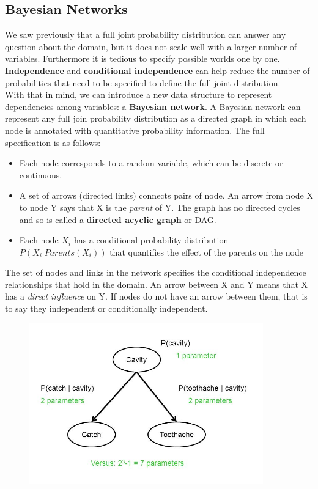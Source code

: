 \documentclass{article}
\newcommand{\n}[0]{\\[\baselineskip]}
\begin{document}
\subsection{Bayesian Networks}
We saw previously that a full joint probability distribution can answer any question about the domain, but it does not scale well with a larger number of variables. Furthermore it is tedious to specify possible worlds one by one. \textbf{Independence} and \textbf{conditional independence} can help reduce the number of probabilities that need to be specified to define the full joint distribution.
\n
With that in mind, we can introduce a new data structure to represent dependencies among variables: a \textbf{Bayesian network}. A Bayesian network can represent any full join probability distribution as a directed graph in which each node is annotated with quantitative probability information. The full specification is as follows:
\begin{itemize}
\item Each node corresponds to a random variable, which can be discrete or continuous.
\item A set of arrows (directed links) connects pairs of node. An arrow from node X to node Y says that X is the \textit{parent} of Y. The graph has no directed cycles and so is called a \textbf{directed acyclic graph} or DAG.
\item Each node $X_{i}$ has a conditional probability distribution $P(X_{i}|Parents(X_{i}))$ that quantifies the effect of the parents on the node
\end{itemize}
The set of nodes and links in the network specifies the conditional independence relationships that hold in the domain. An arrow between X and Y means that X has a \textit{direct influence} on Y. If nodes do not have an arrow between them, that is to say they independent or conditionally independent. 
\begin{figure}[H]
\centering
\includegraphics[width=0.9\textwidth, keepaspectratio]{imgs/toothache-bayes-network.png}
\end{figure}
\end{document}
